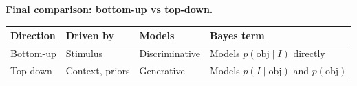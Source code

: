 \textbf{Final comparison: bottom-up vs top-down.}

\begin{center}
\renewcommand{\arraystretch}{1.3}
\begin{tabular}{@{} l l l l @{}}
\toprule
\textbf{Direction} & \textbf{Driven by} & \textbf{Models} & \textbf{Bayes term} \\
\midrule
Bottom-up & Stimulus            & Discriminative & Models $p(\text{obj}\mid I)$ directly \\
Top-down  & Context, priors     & Generative     & Models $p(I\mid\text{obj})$ and $p(\text{obj})$ \\
\bottomrule
\end{tabular}
\end{center}
